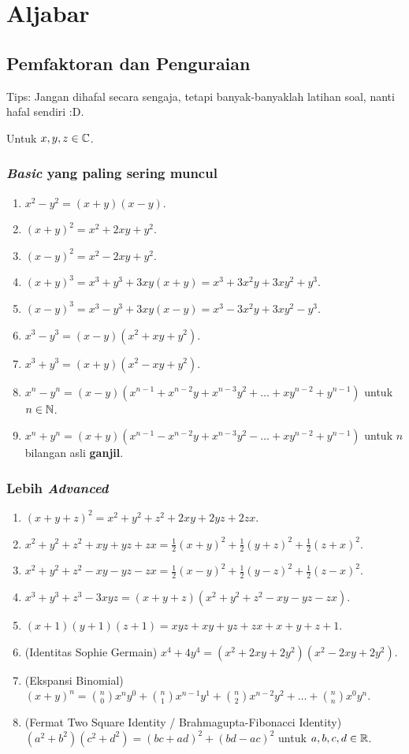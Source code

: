 \section{Aljabar}
\subsection{Pemfaktoran dan Penguraian}
Tips: Jangan dihafal secara sengaja, tetapi banyak-banyaklah latihan soal, nanti hafal sendiri :D.
	
	Untuk $x,y,z \in \mathbb C$.

        \subsubsection{\textit{Basic} yang paling sering muncul}
        \begin{enumerate}
        \item $x^2-y^2 = (x+y)(x-y)$.
	    \item $(x+y)^2 = x^2+2xy+y^2$.
	    \item $(x-y)^2 = x^2-2xy+y^2$.
            \item $(x+y)^3 = x^3+y^3+3xy(x+y) = x^3+3x^2y+3xy^2+y^3$. 
	    \item $(x-y)^3 = x^3-y^3+3xy(x-y) = x^3-3x^2y+3xy^2-y^3$. 
	    \item $x^3-y^3 = (x-y)(x^2+xy+y^2)$.
	    \item $x^3+y^3 = (x+y)(x^2-xy+y^2)$.
	    \item $x^n-y^n = (x-y)(x^{n-1}+x^{n-2}y+x^{n-3}y^2+\dots+xy^{n-2}+y^{n-1})$ untuk $n \in \mathbb N$.
	    \item $x^n+y^n = (x+y)(x^{n-1}-x^{n-2}y+x^{n-3}y^2-\dots+xy^{n-2}+y^{n-1})$ untuk $n$ bilangan asli \textbf{ganjil}.
        \end{enumerate}

        \subsubsection{Lebih \textit{Advanced}}
	\begin{enumerate}
	    \item $(x+y+z)^2 = x^2+y^2+z^2+2xy+2yz+2zx$.
	    \item $x^2+y^2+z^2+xy+yz+zx = \frac12(x+y)^2+\frac12(y+z)^2+\frac12(z+x)^2$.
	    \item $x^2+y^2+z^2-xy-yz-zx = \frac12(x-y)^2+\frac12(y-z)^2+\frac12(z-x)^2$.
	    \item $x^3+y^3+z^3-3xyz = (x+y+z)(x^2+y^2+z^2-xy-yz-zx)$.
	    \item $(x+1)(y+1)(z+1)=xyz+xy+yz+zx+x+y+z+1$.
	    \item (Identitas Sophie Germain) $x^4+4y^4=(x^2+2xy+2y^2)(x^2-2xy+2y^2)$.
	    \item (Ekspansi Binomial) $(x+y)^n = {n \choose 0}x^ny^0 + {n \choose 1}x^{n-1}y^1+{n \choose 2}x^{n-2}y^2 + \dots + {n \choose n}x^0y^n$.
	    \item (Fermat Two Square Identity / Brahmagupta-Fibonacci Identity)\\
        $(a^2+b^2)(c^2+d^2)=(bc+ad)^2+(bd-ac)^2$ untuk $a,b,c,d \in \mathbb R$.
	\end{enumerate}

